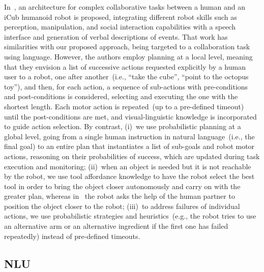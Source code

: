 In~\cite{moulin-frier:2018:tcds}, an architecture for complex collaborative tasks between a human and an iCub humanoid robot is proposed, integrating different robot skills such as perception, manipulation, and social interaction capabilities with a speech interface and generation of verbal descriptions of events.
That work has similarities with our proposed approach, being targeted to a \hr{} collaboration task using language.
However, the authors employ planning at a local level, meaning that they envision a list of successive actions requested explicitly by a human user to a robot, one after another~(i.e., ``take the cube'', ``point to the octopus toy''), and then, for each action, a sequence of sub-actions with pre-conditions and post-conditions is considered, selecting and executing the one with the shortest length.
Each motor action is repeated~(up to a pre-defined timeout) until the post-conditions are met, and visual-linguistic knowledge is incorporated to guide action selection.
By contrast,
(i)~we use probabilistic planning at a global level, going from a single human instruction in natural language~(i.e., the final goal) to an entire plan that instantiates a list of sub-goals and robot motor actions, reasoning on their probabilities of success, which are updated during task execution and monitoring;
(ii)~when an object is needed but it is not reachable by the robot, we use tool affordance knowledge to have the robot select the best tool in order to bring the object closer autonomously and carry on with the greater plan, whereas in~\cite{moulin-frier:2018:tcds} the robot asks the help of the human partner to position the object closer to the robot;
(iii)~to address failures of individual actions, we use probabilistic strategies and heuristics~(e.g., the robot tries to use an alternative arm or an alternative ingredient if the first one has failed repeatedly) instead of pre-defined timeouts.

\subsection{\acl{NLU}}
\label{sec:poeticon++:related_work:nlu}

